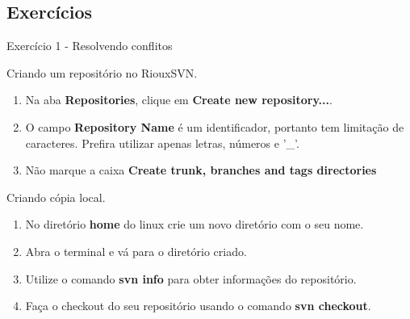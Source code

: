 \documentclass[a4paper]{beamer}
\begin{document}
\subsection{Exercícios}

\begin{frame}{Exercício 1 - Resolvendo conflitos}

Criando um repositório no RiouxSVN.
\begin{enumerate}
\item Na aba \textbf{Repositories}, clique em \textbf{Create new repository...}.
\item O campo \textbf{Repository Name} é um identificador, portanto tem limitação de caracteres. Prefira utilizar apenas letras, números e '\_'.
\item Não marque a caixa \textbf{Create trunk, branches and tags directories}
\end{enumerate}

\pause
\vspace{10pt}
Criando cópia local.
\begin{enumerate}
\item No diretório \textbf{home} do linux crie um novo diretório com o seu nome.
\item Abra o terminal e vá para o diretório criado.
\item Utilize o comando \textbf{svn info} para obter informações do repositório.
\item Faça o checkout do seu repositório usando o comando \textbf{svn checkout}.
\end{enumerate}

\end{frame}
\end{document}
